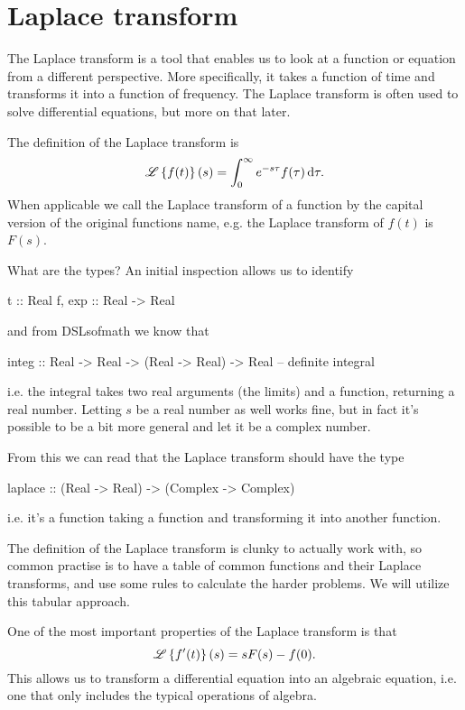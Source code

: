 
\section{Laplace transform}
The Laplace transform is a tool that enables us to look at a function or equation from a different perspective. More specifically, it takes a function of time and transforms it into a function of frequency.
The Laplace transform is often used to solve differential equations, but more on that later. 

The definition of the Laplace transform is  
\begin{equation*}
    \mathscr{L} \left\{ f(t)\right\}(s) = \int_0^\infty e^{-s\tau} f(\tau) \, \text{d} \tau.
\end{equation*}
When applicable we call the Laplace transform of a function by the capital version of the original functions name, e.g. the Laplace transform of $f(t)$ is $F(s)$.

What are the types? An initial inspection allows us to identify
\begin{code}
t      :: Real 
f, exp :: Real -> Real 
\end{code}
and from DSLsofmath we know that 
\begin{code}
integ :: Real -> Real -> (Real -> Real) -> Real -- definite integral \end{code}%
i.e. the integral takes two real arguments (the limits) and a function, returning a real number. 
Letting $s$ be a real number as well works fine, but in fact it's possible to be a bit more general and let it be a complex number. 

From this we can read that the Laplace transform should have the type
\begin{code}
laplace :: (Real -> Real) -> (Complex -> Complex) 
\end{code}
i.e. it's a function taking a function and transforming it into another function. 

The definition of the Laplace transform is clunky to actually work with, so common practise is to have a table of common functions and their Laplace transforms, and use some rules to calculate the harder problems. We will utilize this tabular approach. 

One of the most important properties of the Laplace transform is that
\begin{equation*}
    \mathscr{L} \left\{ f'(t)\right\} (s) = s F(s) - f(0).
\end{equation*}
This allows us to transform a differential equation into an algebraic equation, i.e. one that only includes the typical operations of algebra.


